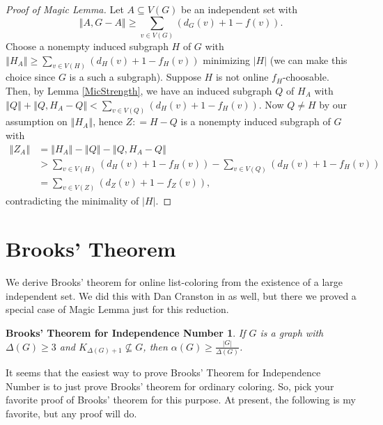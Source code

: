 \documentclass[12pt]{article}
\theoremstyle{plain}
\newtheorem*{BrooksTheoremAlpha}{Brooks' Theorem for Independence Number}
\theoremstyle{definition}
\theoremstyle{remark}
\newcommand{\card}[1]{\left|#1\right|}
\newcommand{\size}[1]{\left\Vert#1\right\Vert}
\newcommand{\parens}[1]{\left( #1 \right)}
\newcommand{\DefinedAs}{\mathrel{\mathop:}=}
\begin{document}
\begin{proof}[Proof of Magic Lemma]
	Let $A \subseteq V(G)$ be an independent set with 
	\[\size{A, G-A} \ge \sum_{v \in V(G)} \parens{d_G(v) + 1 - f(v)}.\] Choose a nonempty induced subgraph $H$ of $G$ with $\size{H_A} \ge \sum_{v \in V(H)} \parens{d_H(v) + 1 - f_H(v)}$ minimizing $\card{H}$ (we can make this choice since $G$ is a such a subgraph). Suppose $H$ is not online $f_H$-choosable. Then, by Lemma \ref{MicStrength}, we have an induced subgraph $Q$ of $H_A$ with $\size{Q} + \size{Q, H_A - Q} < \sum_{v \in V(Q)} \parens{d_H(v) + 1 - f_H(v)}$.  Now $Q \ne H$ by our assumption on $\size{H_A}$, hence $Z \DefinedAs H-Q$ is a nonempty induced subgraph of $G$ with 
	\begin{align*}
	\size{Z_A} &= \size{H_A} - \size{Q} - \size{Q, H_A - Q} \\ 
	&> \sum_{v \in V(H)} \parens{d_H(v) + 1 - f_H(v)} - \sum_{v \in V(Q)} \parens{d_H(v) + 1 - f_H(v)} \\
	&= \sum_{v \in V(Z)} \parens{d_Z(v) + 1 - f_Z(v)},
	\end{align*} contradicting the minimality of $\card{H}$.
\end{proof}

\section{Brooks' Theorem}
We derive Brooks' theorem for online list-coloring from the existence of a large independent set.  We did this with Dan Cranston in \cite{brooksbeyond} as well, but there we proved a special case of Magic Lemma just for this reduction.

\begin{BrooksTheoremAlpha}
	If $G$ is a graph with $\Delta(G) \ge 3$ and $K_{\Delta(G) + 1} \not \subseteq G$, then $\alpha(G) \ge
	\frac{|G|}{\Delta(G)}$.
\end{BrooksTheoremAlpha}

It seems that the easiest way to prove Brooks' Theorem for Independence Number is to just prove Brooks' theorem for ordinary coloring.  
So, pick your favorite proof of Brooks' theorem for this purpose.  At present, the following \cite{rabern2014yet} is my favorite, but any proof will do.
\end{document}
